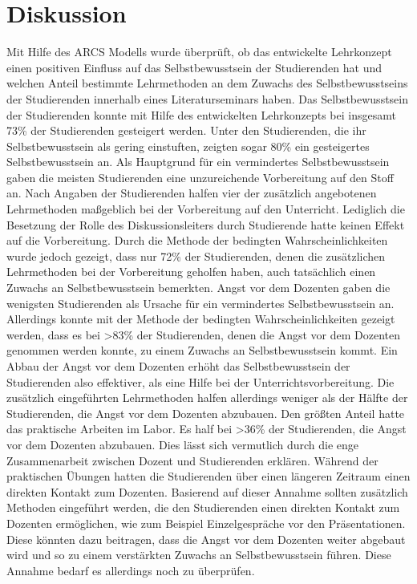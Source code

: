 \section{Diskussion}
Mit Hilfe des ARCS Modells wurde überprüft, ob das entwickelte Lehrkonzept einen positiven Einfluss auf das Selbstbewusstsein der Studierenden hat und welchen Anteil bestimmte Lehrmethoden an dem Zuwachs des Selbstbewusstseins der Studierenden innerhalb eines Literaturseminars haben. Das Selbstbewusstsein der Studierenden konnte mit Hilfe des entwickelten Lehrkonzepts bei insgesamt 73\% der Studierenden gesteigert werden. Unter den Studierenden, die ihr Selbstbewusstsein als gering einstuften, zeigten sogar 80\% ein gesteigertes Selbstbewusstsein an. Als Hauptgrund für ein vermindertes Selbstbewusstsein gaben die meisten Studierenden eine unzureichende Vorbereitung auf den Stoff an. Nach Angaben der Studierenden halfen vier der zusätzlich angebotenen Lehrmethoden maßgeblich bei der Vorbereitung auf den Unterricht. Lediglich die Besetzung der Rolle des Diskussionsleiters durch Studierende hatte keinen Effekt auf die Vorbereitung. Durch die Methode der bedingten Wahrscheinlichkeiten wurde jedoch gezeigt, dass nur 72\% der Studierenden, denen die zusätzlichen Lehrmethoden bei der Vorbereitung geholfen haben, auch tatsächlich einen Zuwachs an Selbstbewusstsein bemerkten. Angst vor dem Dozenten gaben die wenigsten Studierenden als Ursache für ein vermindertes Selbstbewusstsein an. Allerdings konnte mit der Methode der bedingten Wahrscheinlichkeiten gezeigt werden, dass es bei >83\% der Studierenden, denen die Angst vor dem Dozenten genommen werden konnte, zu einem Zuwachs an Selbstbewusstsein kommt. Ein Abbau der Angst vor dem Dozenten erhöht das Selbstbewusstsein der Studierenden also effektiver, als eine Hilfe bei der Unterrichtsvorbereitung. Die zusätzlich eingeführten Lehrmethoden halfen allerdings weniger als der Hälfte der Studierenden, die Angst vor dem Dozenten abzubauen. Den größten Anteil hatte das praktische Arbeiten im Labor. Es half bei >36\% der Studierenden, die Angst vor dem Dozenten abzubauen. Dies lässt sich vermutlich durch die enge Zusammenarbeit zwischen Dozent und Studierenden erklären. Während der praktischen Übungen hatten die Studierenden über einen längeren Zeitraum einen direkten Kontakt zum Dozenten. Basierend auf dieser Annahme sollten zusätzlich Methoden eingeführt werden, die den Studierenden einen direkten Kontakt zum Dozenten ermöglichen, wie zum Beispiel Einzelgespräche vor den Präsentationen. Diese könnten dazu beitragen, dass die Angst vor dem Dozenten weiter abgebaut wird und so zu einem verstärkten Zuwachs an Selbstbewusstsein führen. Diese Annahme bedarf es allerdings noch zu überprüfen.